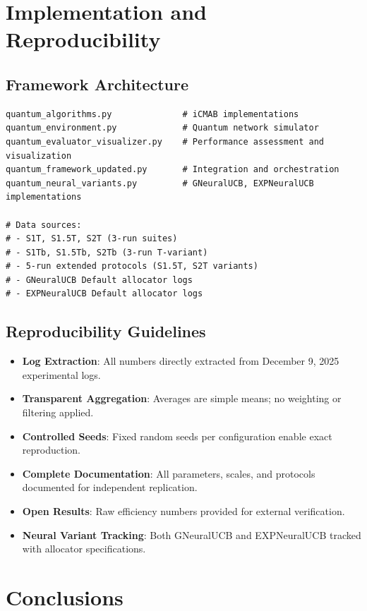 \documentclass[12pt,a4paper]{article}
\begin{document}
\section{Implementation and Reproducibility}

\subsection{Framework Architecture}
\begin{lstlisting}[caption=Core iCMAB and Neural Framework Components]
quantum_algorithms.py              # iCMAB implementations
quantum_environment.py             # Quantum network simulator
quantum_evaluator_visualizer.py    # Performance assessment and visualization
quantum_framework_updated.py       # Integration and orchestration
quantum_neural_variants.py         # GNeuralUCB, EXPNeuralUCB implementations

# Data sources:
# - S1T, S1.5T, S2T (3-run suites)
# - S1Tb, S1.5Tb, S2Tb (3-run T-variant)
# - 5-run extended protocols (S1.5T, S2T variants)
# - GNeuralUCB Default allocator logs
# - EXPNeuralUCB Default allocator logs
\end{lstlisting}

\subsection{Reproducibility Guidelines}
\begin{itemize}
\item \textbf{Log Extraction}: All numbers directly extracted from December 9, 2025 experimental logs.
\item \textbf{Transparent Aggregation}: Averages are simple means; no weighting or filtering applied.
\item \textbf{Controlled Seeds}: Fixed random seeds per configuration enable exact reproduction.
\item \textbf{Complete Documentation}: All parameters, scales, and protocols documented for independent replication.
\item \textbf{Open Results}: Raw efficiency numbers provided for external verification.
\item \textbf{Neural Variant Tracking}: Both GNeuralUCB and EXPNeuralUCB tracked with allocator specifications.
\end{itemize}

\newpage
\section{Conclusions}
\end{document}
